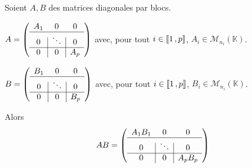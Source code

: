     \begin{prop}{}{}
        Soient $A,B$ des matrices diagonales par blocs. \begin{suppose}
            \item $A = \left( \begin{array}{c | c | c}
                A_1 & 0 & 0 \\
                \hline 
                0 & \ddots & 0 \\
                \hline
                0 & 0 & A_p
            \end{array} \right)$ avec, pour tout $i \in \left\llbracket 1 \, , p \right\rrbracket$, $A_i \in \mathcal{M}_{n_i}(\mathbb{K})$.
            \item $B = \left( \begin{array}{c | c | c}
                B_1 & 0 & 0 \\
                \hline 
                0 & \ddots & 0 \\
                \hline
                0 & 0 & B_p
            \end{array} \right)$ avec, pour tout $i \in \left\llbracket 1 \, , p \right\rrbracket$, $B_i \in \mathcal{M}_{n_i}(\mathbb{K})$.
        \end{suppose}
        Alors \[ AB = \left( \begin{array}{c | c | c}
                A_1 B_1 & 0 & 0 \\
                \hline
                0 & \ddots & 0 \\
                \hline
                0 & 0 & A_p B_p
            \end{array} \right) \]   
    \end{prop}

